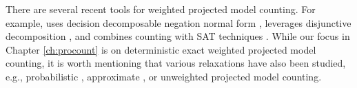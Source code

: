 There are several recent tools for weighted projected model counting.
For example, \dfp{} uses decision decomposable negation normal form \cite{lagniez2019recursive}, \projmc{} leverages disjunctive decomposition \cite{lagniez2019recursive}, and \ssat{} combines counting with SAT techniques \cite{lee2017solving}. 
While our focus in Chapter \ref{ch:procount} is on deterministic exact weighted projected model counting, it is worth mentioning that various relaxations have also been studied, e.g., probabilistic \cite{sharma2019ganak}, approximate \cite{ermon2013taming,fremont2017maximum,soos2019bird}, or unweighted \cite{zawadzki2013generalization,aziz2015projected,mohle2018dualizing,hecher2020taming} projected model counting.